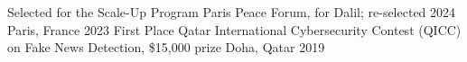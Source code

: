 

\begin{cvhonors}

  \cvhonor
    {Selected for the Scale-Up Program} %
    {Paris Peace Forum, for Dalil; re-selected 2024} %
    {Paris, France} %
    {2023} %
  \cvhonor
    {First Place} %
    {Qatar International Cybersecurity Contest (QICC) on Fake News Detection, \$15,000 prize} %
    {Doha, Qatar} %
    {2019} %
\end{cvhonors}






